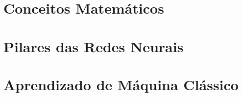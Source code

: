 \documentclass[
    12pt,            %
    a4paper,         %
    book,            %
    openright,       %
    twoside,         %
    brazil,          %
    citacao=authoryear
]{abntex2}
\begin{document}
\part{Conceitos Matemáticos}





\part{Pilares das Redes Neurais}












\part{Aprendizado de Máquina Clássico}








\end{document}

